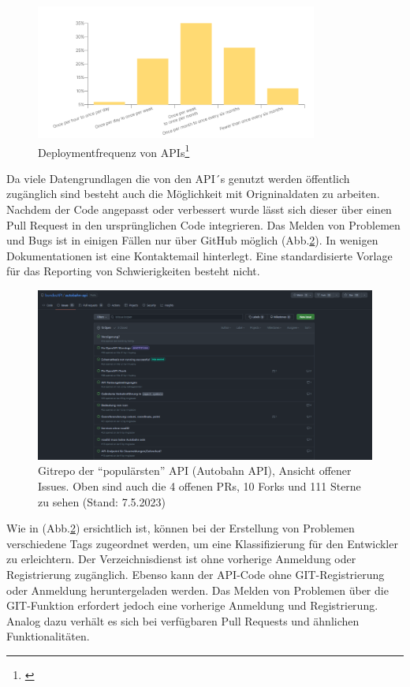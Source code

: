 \documentclass[notitlepage, hidelinks]{article}
\begin{document}
\begin{figure}[H]
\centering
  \includegraphics[width=350px]{images/stateofapideploymentfreq.png}
  \caption{Deploymentfrequenz von APIs\protect\footnote{\cite{api-postman}}}
  \label{stateofapideploymentfreq}
\end{figure}

 Da viele Datengrundlagen die von den API´s genutzt werden öffentlich zugänglich sind besteht auch die Möglichkeit mit Origninaldaten zu arbeiten. Nachdem der Code angepasst oder verbessert wurde lässt sich dieser über einen Pull Request in den ursprünglichen Code integrieren. 
Das Melden von Problemen und Bugs ist in einigen Fällen nur über GitHub möglich (Abb.\ref{gitissues}). In wenigen Dokumentationen ist eine Kontaktemail hinterlegt. Eine standardisierte Vorlage für das Reporting von Schwierigkeiten besteht nicht.

\begin{figure}[H]
\centering
  \includegraphics[width=\textwidth]{images/gitissues.png}
  \caption{Gitrepo der ``populärsten'' API (Autobahn API), Ansicht offener Issues. Oben sind auch die 4 offenen PRs, 10 Forks und 111 Sterne zu sehen (Stand: 7.5.2023)}
  \label{gitissues}
\end{figure}

Wie in (Abb.\ref{gitissues}) ersichtlich ist, können bei der Erstellung von Problemen verschiedene Tags zugeordnet werden, um eine Klassifizierung für den Entwickler zu erleichtern.
Der Verzeichnisdienst ist ohne vorherige Anmeldung oder Registrierung zugänglich. Ebenso kann der API-Code ohne GIT-Registrierung oder Anmeldung heruntergeladen werden. Das Melden von Problemen über die GIT-Funktion erfordert jedoch eine vorherige Anmeldung und Registrierung. Analog dazu verhält es sich bei verfügbaren Pull Requests und ähnlichen Funktionalitäten.
\end{document}
